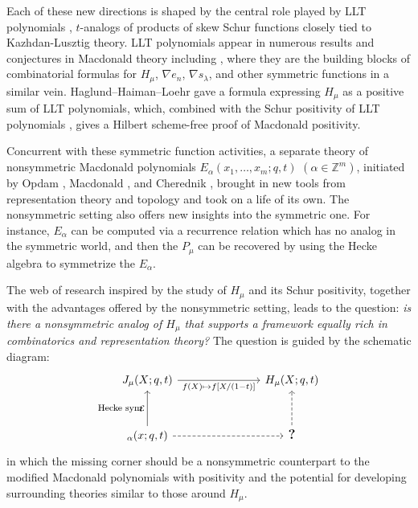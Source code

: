 \documentclass[12pt]{amsart}
\theoremstyle{definition}
\theoremstyle{remark}
\newcommand{\ZZ}{{\mathbb Z}}
\newcommand{\Ecal}{{\mathcal E}}
\begin{document}
Each of these new directions is shaped by the central role played by
LLT polynomials \cite{LasLecTh97}, $t$-analogs of products of skew
Schur functions closely tied to Kazhdan-Lusztig theory.  LLT
polynomials appear in numerous results and conjectures in Macdonald
theory including
\cite{AggBorWhe23, CarlMell18, HaHaLoRU05, HRW18,
KimLeeOh22, LeeOhRho23, LoehWarr08, Mellit16}, where they are the
building blocks of combinatorial formulas for $H_\mu$, $\nabla e_n$,
$\nabla s_\lambda$, and other symmetric functions in a similar vein.
Haglund--Haiman--Loehr \cite{HagHaiLo05} gave a formula expressing
$H_\mu$ as a positive sum of LLT polynomials, which, combined with the
Schur positivity of LLT polynomials \cite{GrojHaim07}, gives a Hilbert
scheme-free proof of Macdonald positivity.

Concurrent with these symmetric function activities, a separate theory
of nonsymmetric Macdonald polynomials \(E_\alpha(x_1,\ldots,x_m;q,t)\)
$(\alpha\in \ZZ^m)$, initiated by Opdam \cite{Opdam}, Macdonald
\cite{Macdonald03}, and Cherednik \cite{Cheredniknsmac}, brought in
new tools from representation theory and topology and took on a life
of its own.  The nonsymmetric setting also offers new insights into
the symmetric one.  For instance, \( E_\alpha \) can be computed via a
recurrence relation \cite{Knop97, Sahiinterpolation} which has no
analog in the symmetric world, and then the \( P_\mu \) can be
recovered by using the Hecke algebra to symmetrize the \( E_\alpha \).


The web of research inspired by the study of \( H_\mu \) and its Schur
positivity, together with the advantages offered by the nonsymmetric
setting, leads to the question: \emph{\textsf{is there a nonsymmetric
analog of \( H_\mu \) that supports a framework equally rich in
combinatorics and representation theory?}} The question is guided by
the schematic diagram: \newcommand{\Toplabel}{f(X) \mapsto f[X/(1-t)]}
\begin{equation}
\label{e modnsmac square}
\begin{tikzcd}[column sep = 2.6cm, row sep = 1.1cm]
 J_{\mu}(X;q,t)
\arrow{r}[swap]{\Toplabel}
&
H_{\mu}(X;q,t)
\\
\arrow{u}{\, \raisebox{-2mm}{\text{\footnotesize{Hecke sym.}}}}
  \Ecal_{\alpha}(x;q,t)   \ar[dashed,r] &
\textbf{\large ?}
\ar[dashed, u, " "]
\end{tikzcd}
\end{equation}
in which the missing corner should be a nonsymmetric counterpart to the
modified Macdonald polynomials with positivity and the potential for
developing surrounding theories similar to those around $H_\mu$.
\end{document}
